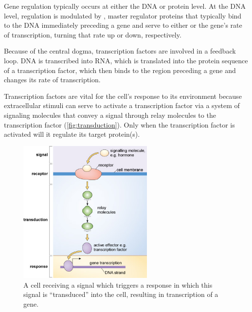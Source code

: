 Gene regulation typically occurs at either the DNA or protein level. At the DNA level, regulation is modulated by , master regulator proteins that typically bind to the DNA immediately preceding a gene and serve to either  or  the gene's rate of transcription, turning that rate up or down, respectively.

Because of the central dogma, transcription factors are involved in a feedback loop. DNA is transcribed into RNA, which is translated into the protein sequence of a transcription factor, which then binds to the region preceding a gene and changes its rate of transcription.

Transcription factors are vital for the cell's response to its environment because extracellular stimuli can serve to activate a transcription factor via a system of signaling molecules that convey a signal through relay molecules to the transcription factor (\autoref{fig:transduction}). Only when the transcription factor is activated will it regulate its target protein(s).\\

\begin{figure}[h]
\centering
\mySfFamily
\includegraphics[width = 0.6\textwidth]{../images/signal_pathway.jpg}
\caption{A cell receiving a signal which triggers a response in which this signal is ``transduced'' into the cell, resulting in transcription of a gene.}
\label{fig:transduction}
\end{figure}

